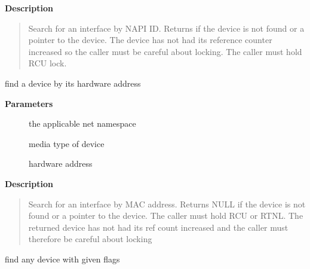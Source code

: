 \documentclass[a4paper,8pt,english]{sphinxmanual}
\begin{document}
\textbf{Description}
\begin{quote}

Search for an interface by NAPI ID. Returns  if the device
is not found or a pointer to the device. The device has not had
its reference counter increased so the caller must be careful
about locking. The caller must hold RCU lock.
\end{quote}

\begin{fulllineitems}
\label{networking/kapi:c.dev_getbyhwaddr_rcu}
find a device by its hardware address

\end{fulllineitems}


\textbf{Parameters}
\begin{description}
\item[{}] \leavevmode
the applicable net namespace

\item[{}] \leavevmode
media type of device

\item[{}] \leavevmode
hardware address

\end{description}

\textbf{Description}
\begin{quote}

Search for an interface by MAC address. Returns NULL if the device
is not found or a pointer to the device.
The caller must hold RCU or RTNL.
The returned device has not had its ref count increased
and the caller must therefore be careful about locking
\end{quote}

\begin{fulllineitems}
\label{networking/kapi:c.__dev_get_by_flags}
find any device with given flags

\end{fulllineitems}
\end{document}
